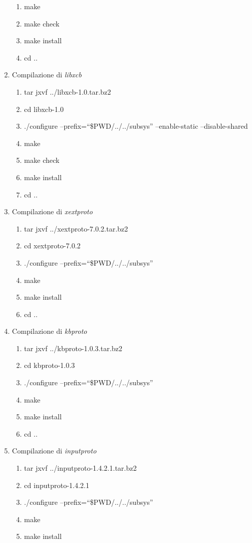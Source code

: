 \begin{enumerate}
\begin{enumerate}
\item make
\item make check
\item make install
\item cd ..
\end{enumerate}
\item Compilazione di \emph{libxcb}
\begin{enumerate}
\item tar jxvf ../libxcb-1.0.tar.bz2
\item cd libxcb-1.0
\item ./configure --prefix=``\$PWD/../../subsys'' --enable-static --disable-shared
\item make
\item make check
\item make install
\item cd ..
\end{enumerate}
\item Compilazione di \emph{xextproto}
\begin{enumerate}
\item tar jxvf ../xextproto-7.0.2.tar.bz2
\item cd xextproto-7.0.2
\item ./configure --prefix=``\$PWD/../../subsys''
\item make
\item make install
\item cd ..
\end{enumerate}
\item Compilazione di \emph{kbproto}
\begin{enumerate}
\item tar jxvf ../kbproto-1.0.3.tar.bz2
\item cd kbproto-1.0.3
\item ./configure --prefix=``\$PWD/../../subsys''
\item make
\item make install
\item cd ..
\end{enumerate}
\item Compilazione di \emph{inputproto}
\begin{enumerate}
\item tar jxvf ../inputproto-1.4.2.1.tar.bz2
\item cd inputproto-1.4.2.1
\item ./configure --prefix=``\$PWD/../../subsys''
\item make
\item make install

\end{enumerate}
\end{enumerate}
